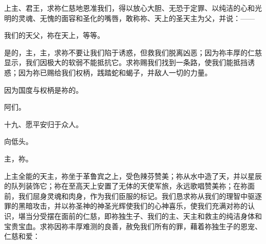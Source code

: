 \par

上主、君王，求祢仁慈地恩准我们，得以放心大胆、无恐于定罪、以纯洁的心和光明的灵魂、无愧的面容和圣化的嘴唇，敢称祢、天上的圣天主为父，并说：——\par

\par

我们的天父，祢在天上，等等。\par

\par

是的，主，主，求祢不要让我们陷于诱惑，但救我们脱离凶恶；因为祢丰厚的仁慈显示，我们因极大的软弱不能抵抗它。求祢赐我们找到一条路，使我们能抵挡诱惑；因为祢已赐给我们权柄，践踏蛇和蝎子，并敌人一切的力量。\par

\par

因为国度与权柄是祢的。\par

\par

阿们。\par

\par

十九、愿平安归于众人。\par

\par

向低头。\par

\par

主，祢。\par

\par

上主全能的天主，祢坐于革鲁宾之上，受色辣芬赞美；祢从水中造了天，并以星辰的队列装饰它；祢在至高天上安置了无体的天使军旅，永远歌唱赞美祢；在祢面前，我们屈身灵魂和肉身，作为我们臣服的标记。我们恳求祢从我们的理智中驱逐罪的黑暗攻击，并以祢圣神的神圣光辉使我们的心神喜乐，使我们充满对祢的认识，堪当分受摆在面前的仁慈，即祢独生子、我们的主、天主和救主的纯洁身体和宝贵宝血。求祢因祢丰厚难测的良善，赦免我们所有的罪，藉着祢独生子的恩宠、仁慈和爱：\par

